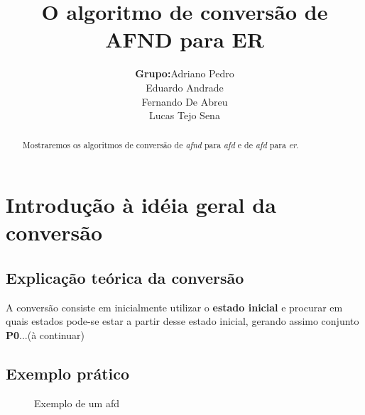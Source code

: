 \documentclass[a4paper,10pt]{article} %
\title{O algoritmo de conversão de AFND para ER}
\author{
    \begin{tabular}{ll}
        \textbf{Grupo:} &
        Adriano Pedro \tabularnewline &
        Eduardo Andrade\tabularnewline &
        Fernando De Abreu\tabularnewline &
        Lucas Tejo Sena\tabularnewline
    \end{tabular}
}
\begin{document}
\maketitle

\begin{abstract}

Mostraremos os algoritmos de conversão de \textit{afnd} para \textit{afd} e de \textit{afd} para \textit{er}.

\end{abstract}


\section{Introdução à idéia geral da conversão}
\subsection{Explicação teórica da conversão}
A conversão consiste em inicialmente utilizar o \textbf{estado inicial}
e procurar em quais estados pode-se estar a partir desse estado inicial, 
gerando assimo conjunto \textbf{P0}...(à continuar)

\subsection{Exemplo prático}
\begin{figure}[H]%
     \centering %
      \caption{Exemplo de um afd}
      \label{fig:my_label}
\end{figure}          
\end{document}
